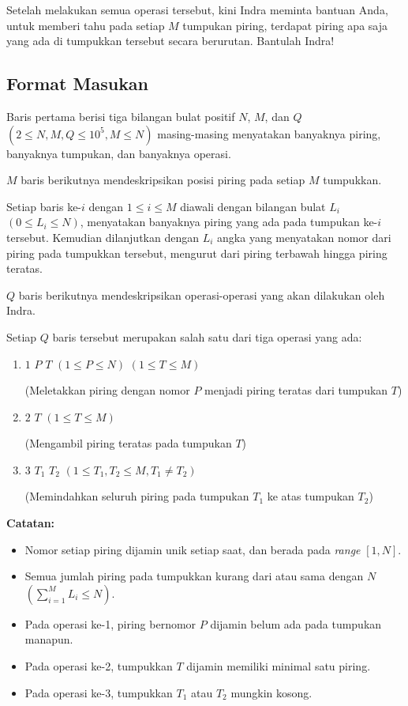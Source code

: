 \documentclass{article}
\begin{document}
Setelah melakukan semua operasi tersebut, kini Indra meminta bantuan Anda, untuk memberi tahu pada setiap $M$ tumpukan piring, terdapat piring apa saja yang ada di tumpukkan tersebut secara berurutan. Bantulah Indra!

\subsection*{Format Masukan}
Baris pertama berisi tiga bilangan bulat positif $N$, $M$, dan $Q$ $(2 \leq N, M, Q \leq 10^5, M \leq N)$ masing-masing menyatakan banyaknya piring, banyaknya tumpukan, dan banyaknya operasi.

$M$ baris berikutnya mendeskripsikan posisi piring pada setiap $M$ tumpukkan.

Setiap baris ke-$i$ dengan $1 \leq i \leq M$ diawali dengan bilangan bulat $L_i$ $(0 \leq L_i \leq N)$, menyatakan banyaknya piring yang ada pada tumpukan ke-$i$ tersebut. Kemudian dilanjutkan dengan $L_i$ angka yang menyatakan nomor dari piring pada tumpukkan tersebut, mengurut dari piring terbawah hingga piring teratas.

$Q$ baris berikutnya mendeskripsikan operasi-operasi yang akan dilakukan oleh Indra.

Setiap $Q$ baris tersebut merupakan salah satu dari tiga operasi yang ada:
\begin{enumerate}
\item $1$ $P$ $T$ $(1 \leq P \leq N)$ $(1 \leq T \leq M)$

(Meletakkan piring dengan nomor $P$ menjadi piring teratas dari tumpukan $T$)
\item $2$ $T$ $(1 \leq T \leq M)$

(Mengambil piring teratas pada tumpukan $T$)
\item $3$ $T_1$ $T_2$ $(1 \leq T_1, T_2 \leq M, T_1 \neq T_2)$

(Memindahkan seluruh piring pada tumpukan $T_1$ ke atas tumpukan $T_2$)
\end{enumerate}

\pagebreak
\textbf{Catatan:}
\begin{itemize}
\item Nomor setiap piring dijamin unik setiap saat, dan berada pada \textit{range} $[1, N]$.
\item Semua jumlah piring pada tumpukkan kurang dari atau sama dengan $N$ $(\sum_{i=1}^{M} L_i \leq N)$.
\item Pada operasi ke-1, piring bernomor $P$ dijamin belum ada pada tumpukan manapun.
\item Pada operasi ke-2, tumpukkan $T$ dijamin memiliki minimal satu piring.
\item Pada operasi ke-3, tumpukkan $T_1$ atau $T_2$ mungkin kosong.
\end{itemize}
\end{document}
